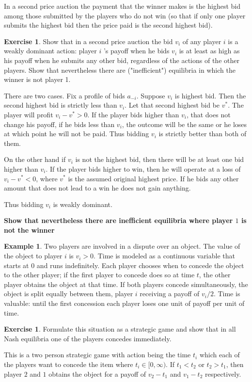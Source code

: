 \documentclass{tufte-handout}
\theoremstyle{definition}
\newtheorem{exmp}[thm]{Example}
\newtheorem{exer}[thm]{Exercise}
\theoremstyle{remark}
\begin{document}
In a second price auction the payment that the winner makes is the highest bid among those submitted by the players who do not win (so that if only one player submits the highest bid then the price paid is the second highest bid).
\begin{exer}
    Show that in a second price auction the bid $v_i$ of any player $i$ is a weakly dominant action: player $i$ 's payoff when he bids $v_i$ is at least as high as his payoff when he submits any other bid, regardless of the actions of the other players. Show that nevertheless there are ("inefficient") equilibria in which the winner is not player 1.
\end{exer}
There are two cases. Fix a profile of bids $a_{-i}$. Suppose $v_i$ is highest bid. Then the second highest bid is strictly less than $v_i$. Let that second highest bid be $v^* $. The player will profit $v_i-v^*>0$. If the player bids higher than $v_i$, that does not change his payoff, if he bids less than $v_i$, the outcome will be the same or he loses at which point he will not be paid. Thus bidding $v_i$ is strictly better than both of them.

On the other hand if $v_i$ is not the highest bid, then there will be at least one bid higher than $v_i$. If the player bids higher to win, then he will operate at a loss of $v_i-v^*<0$, where $v^*$ is the assumed original highest price. If he bids any other amount that does not lead to a win he does not gain anything. 

Thus bidding $v_i$ is weakly dominant.

\textbf{Show that nevertheless there are inefficient equilibria where player $1$ is not the winner}

\begin{exmp}
     Two players are involved in a dispute over an object. The value of the object to player $i$ is $v_i>0$. Time is modeled as a continuous variable that starts at 0 and runs indefinitely. Each player chooses when to concede the object to the other player; if the first player to concede does so at time $t$, the other player obtains the object at that time. If both players concede simultaneously, the object is split equally between them, player $i$ receiving a payoff of $v_i / 2$. Time is valuable: until the first concession each player loses one unit of payoff per unit of time.
\end{exmp}
\begin{exer}
    Formulate this situation as a strategic game and show that in all Nash equilibria one of the players concedes immediately.
\end{exer}
This is a two person strategic game with action being the time $t_i$ which each of the players want to concede the item where $t_i \in [0, \infty)$. If $t_1<t_2$ or $t_2>t_1$, then player $2$ and $1$ obtains the object for a payoff of $v_2-t_1$ and $v_1-t_2$ respectively.
\end{document}
